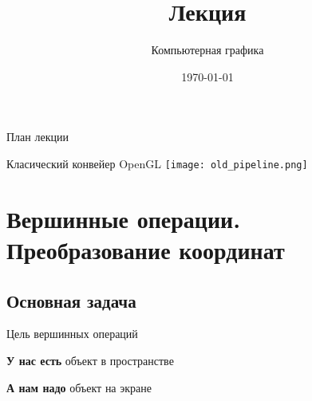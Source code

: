 \documentclass[10pt]{beamer}
\date{\today}
\title{Лекция \lecdni \\ \LectionTheme}
\subtitle{Компьютерная графика}
\begin{document}
 		 


\everymath{\displaystyle}

\begin{comment}

\end{comment}

    
    \QRFRAME
	
	
	\frame{\maketitle}
	
	
	
	\begin{frame}{План лекции}
		\tableofcontents
	\end{frame}
	
	\begin{frame}{Класический конвейер OpenGL}
		\texttt{[image: old\_pipeline.png]}
	\end{frame}
	
	
	\section{Вершинные операции. Преобразование координат  }
	
	\frame{\sectionpage}
	
	
	\subsection{Основная задача}
	
	\begin{frame}{Цель вершинных операций}
		{
			\centering
			\textbf{У нас есть} объект в пространстве
			
		}
		{
			\centering
			\textbf{А нам надо} объект на экране
			
		}
	\end{frame}
	
\end{document}
